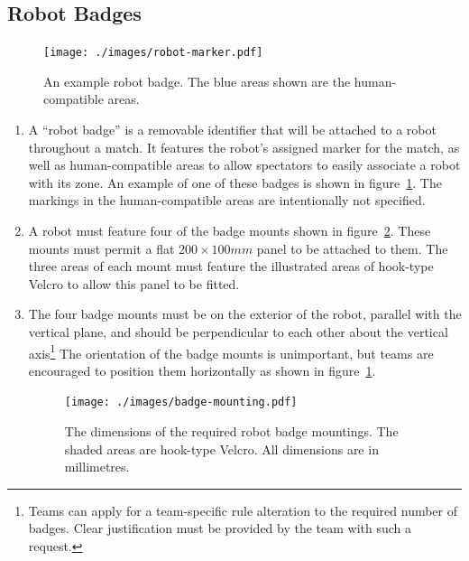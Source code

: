 \subsection{Robot Badges}
\label{sec:robot-badges}

\begin{figure}
  \centering
  \texttt{[image: ./images/robot-marker.pdf]}
  \caption{An example robot badge.  The blue areas shown are the human-compatible areas.}
  \label{fig:example-badge}
\end{figure}

\begin{enumerate}
\item A ``robot badge'' is a removable identifier that will be attached to a robot throughout a match.  It features the robot's assigned marker for the match, as well as human-compatible areas to allow spectators to easily associate a robot with its zone.  An example of one of these badges is shown in figure~\ref{fig:example-badge}.  The markings in the human-compatible areas are intentionally not specified.

\item A robot must feature four of the badge mounts shown in figure~\ref{fig:badge-mounting}.  These mounts must permit a flat $200 \times 100mm$ panel to be attached to them.  The three areas of each mount must feature the illustrated areas of hook-type Velcro to allow this panel to be fitted.

\item The four badge mounts must be on the exterior of the robot, parallel with the vertical plane, and should be perpendicular to each other about the vertical axis\footnote{Teams can apply for a team-specific rule alteration to the required number of badges.  Clear justification must be provided by the team with such a request.}  The orientation of the badge mounts is unimportant, but teams are encouraged to position them horizontally as shown in figure~\ref{fig:example-badge}.

  \begin{figure}
    \centering
    \texttt{[image: ./images/badge-mounting.pdf]}
    \caption{The dimensions of the required robot badge mountings.  The shaded areas are hook-type Velcro.  All dimensions are in millimetres.}
    \label{fig:badge-mounting}
  \end{figure}
\end{enumerate}


